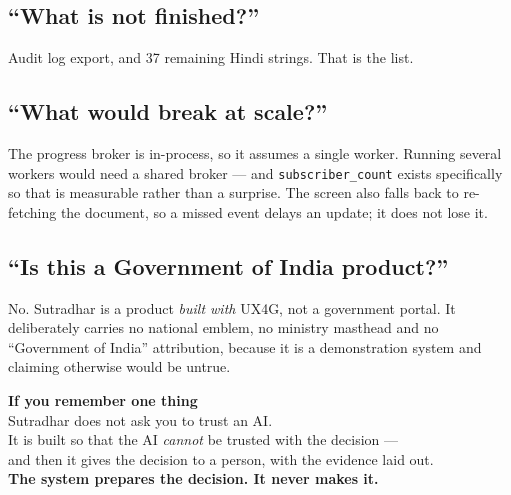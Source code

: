 \documentclass[11pt,a4paper]{article}
\begin{document}
\subsection*{``What is not finished?''}

Audit log export, and 37 remaining Hindi strings. That is the list.

\subsection*{``What would break at scale?''}

The progress broker is in-process, so it assumes a single worker. Running
several workers would need a shared broker --- and \texttt{subscriber\_count}
exists specifically so that is measurable rather than a surprise. The screen
also falls back to re-fetching the document, so a missed event delays an update;
it does not lose it.

\subsection*{``Is this a Government of India product?''}

No. Sutradhar is a product \emph{built with} UX4G, not a government portal. It
deliberately carries no national emblem, no ministry masthead and no
``Government of India'' attribution, because it is a demonstration system and
claiming otherwise would be untrue.

\vspace{1cm}

\begin{center}
\colorbox{shade}{\parbox{0.88\linewidth}{\vspace{6pt}\centering
\textbf{\large If you remember one thing}\\[6pt]
\small
Sutradhar does not ask you to trust an AI.\\
It is built so that the AI \emph{cannot} be trusted with the decision ---\\
and then it gives the decision to a person, with the evidence laid out.\\[6pt]
\textbf{The system prepares the decision. It never makes it.}
\vspace{6pt}}}
\end{center}
\end{document}
